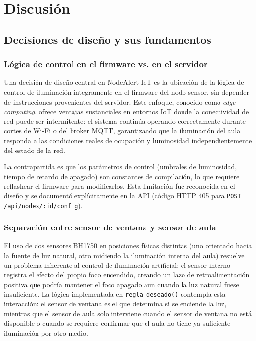 
\section{Discusión}
\label{sec:discusion}

\subsection{Decisiones de diseño y sus fundamentos}

\subsubsection{Lógica de control en el firmware vs. en el servidor}

Una decisión de diseño central en NodeAlert IoT es la ubicación de la lógica de
control de iluminación íntegramente en el firmware del nodo sensor, sin depender de
instrucciones provenientes del servidor. Este enfoque, conocido como
\textit{edge computing}, ofrece ventajas sustanciales en entornos IoT donde la
conectividad de red puede ser intermitente: el sistema continúa operando
correctamente durante cortes de Wi-Fi o del broker MQTT, garantizando que la
iluminación del aula responda a las condiciones reales de ocupación y luminosidad
independientemente del estado de la red.

La contrapartida es que los parámetros de control (umbrales de luminosidad,
tiempo de retardo de apagado) son constantes de compilación, lo que requiere
reflashear el firmware para modificarlos. Esta limitación fue reconocida en el
diseño y se documentó explícitamente en la API (código HTTP 405 para
\texttt{POST /api/nodes/:id/config}).

\subsubsection{Separación entre sensor de ventana y sensor de aula}

El uso de dos sensores BH1750 en posiciones físicas distintas (uno orientado hacia
la fuente de luz natural, otro midiendo la iluminación interna del aula) resuelve
un problema inherente al control de iluminación artificial: el sensor interno
registra el efecto del propio foco encendido, creando un lazo de retroalimentación
positiva que podría mantener el foco apagado aun cuando la luz natural fuese
insuficiente. La lógica implementada en \texttt{regla\_deseado()} contempla esta
interacción: el sensor de ventana es el que determina si se enciende la luz,
mientras que el sensor de aula solo interviene cuando el sensor de ventana no está
disponible o cuando se requiere confirmar que el aula no tiene ya suficiente
iluminación por otro medio.

